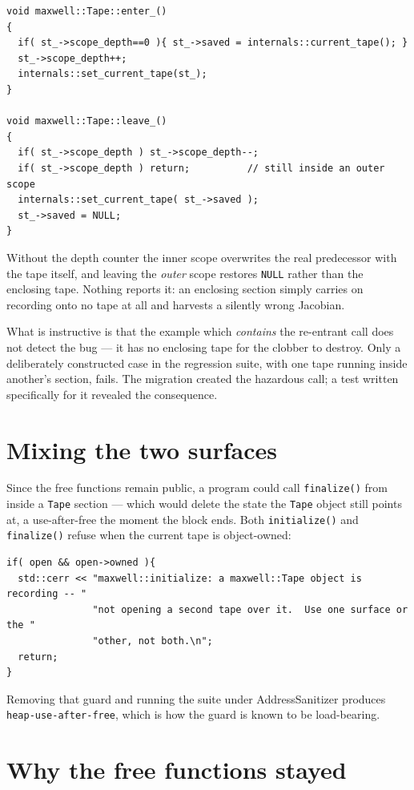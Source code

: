 \documentclass[11pt,a4paper]{report}
\newcommand{\code}[1]{\texttt{#1}}
\begin{document}
\begin{lstlisting}
void maxwell::Tape::enter_()
{
  if( st_->scope_depth==0 ){ st_->saved = internals::current_tape(); }
  st_->scope_depth++;
  internals::set_current_tape(st_);
}

void maxwell::Tape::leave_()
{
  if( st_->scope_depth ) st_->scope_depth--;
  if( st_->scope_depth ) return;          // still inside an outer scope
  internals::set_current_tape( st_->saved );
  st_->saved = NULL;
}
\end{lstlisting}

Without the depth counter the inner scope overwrites the real predecessor with
the tape itself, and leaving the \emph{outer} scope restores \code{NULL} rather
than the enclosing tape. Nothing reports it: an enclosing section simply carries
on recording onto no tape at all and harvests a silently wrong Jacobian.

What is instructive is that the example which \emph{contains} the re-entrant
call does not detect the bug --- it has no enclosing tape for the clobber to
destroy. Only a deliberately constructed case in the regression suite, with one
tape running inside another's section, fails. The migration created the
hazardous call; a test written specifically for it revealed the consequence.

\section{Mixing the two surfaces}

Since the free functions remain public, a program could call \code{finalize()}
from inside a \code{Tape} section --- which would delete the state the
\code{Tape} object still points at, a use-after-free the moment the block ends.
Both \code{initialize()} and \code{finalize()} refuse when the current tape is
object-owned:

\begin{lstlisting}
if( open && open->owned ){
  std::cerr << "maxwell::initialize: a maxwell::Tape object is recording -- "
               "not opening a second tape over it.  Use one surface or the "
               "other, not both.\n";
  return;
}
\end{lstlisting}

Removing that guard and running the suite under AddressSanitizer produces
\code{heap-use-after-free}, which is how the guard is known to be load-bearing.

\section{Why the free functions stayed}
\end{document}
